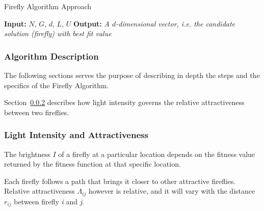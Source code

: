 \begin{algorithm}
	\caption{Firefly Algorithm Approach} \label{alg:fa}
	\begin{algorithmic}
		\newline
		\textbf{Input:} $N$, $G$, $d$, $L$, $U$ \newline
		\textbf{Output:} \textit{A $d$-dimensional vector,
			i.e. the candidate solution (firefly) with best fit value}
						\EndIf
				\EndFor
			\EndFor
		\EndWhile
		\EndProcedure
	\end{algorithmic}
\end{algorithm}

\subsubsection{Algorithm Description}

The following sections serves the purpose of describing in depth the steps
and the specifics of the Firefly Algorithm.

Section~\ref{sec:5.light_attract} describes how light intensity governs
the relative attractiveness between two fireflies. 


\subsubsection{Light Intensity and Attractiveness}
\label{sec:5.light_attract}

The brightness $I$ of a firefly at a particular location depends
on the fitness value returned by the fitness function at that specific location.

Each firefly follows a path that brings it closer to other
attractive fireflies. Relative attractiveness $\Lambda_{ij}$ however is relative,
and it will vary with the distance $r_{ij}$ between firefly \textit{i} and \textit{j}.

